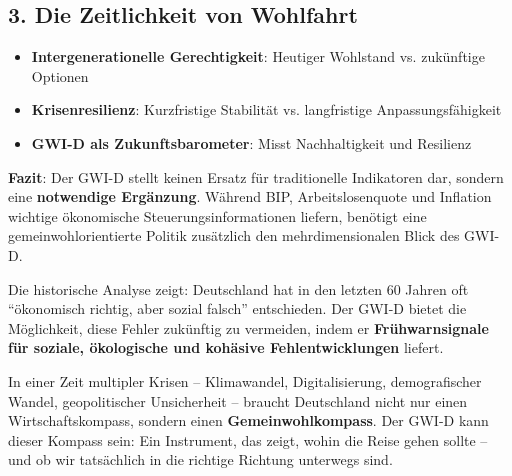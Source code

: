 \subsection{3. Die Zeitlichkeit von Wohlfahrt}

\begin{itemize}
    \item \textbf{Intergenerationelle Gerechtigkeit}: Heutiger Wohlstand vs. zukünftige Optionen
    \item \textbf{Krisenresilienz}: Kurzfristige Stabilität vs. langfristige Anpassungsfähigkeit
    \item \textbf{GWI-D als Zukunftsbarometer}: Misst Nachhaltigkeit und Resilienz
\end{itemize}

\textbf{Fazit}: Der GWI-D stellt keinen Ersatz für traditionelle Indikatoren dar, sondern eine \textbf{notwendige Ergänzung}. Während BIP, Arbeitslosenquote und Inflation wichtige ökonomische Steuerungsinformationen liefern, benötigt eine gemeinwohlorientierte Politik zusätzlich den mehrdimensionalen Blick des GWI-D.

Die historische Analyse zeigt: Deutschland hat in den letzten 60 Jahren oft \enquote{ökonomisch richtig, aber sozial falsch} entschieden. Der GWI-D bietet die Möglichkeit, diese Fehler zukünftig zu vermeiden, indem er \textbf{Frühwarnsignale für soziale, ökologische und kohäsive Fehlentwicklungen} liefert.

In einer Zeit multipler Krisen – Klimawandel, Digitalisierung, demografischer Wandel, geopolitischer Unsicherheit – braucht Deutschland nicht nur einen Wirtschaftskompass, sondern einen \textbf{Gemeinwohlkompass}. Der GWI-D kann dieser Kompass sein: Ein Instrument, das zeigt, wohin die Reise gehen sollte – und ob wir tatsächlich in die richtige Richtung unterwegs sind.

\endinput